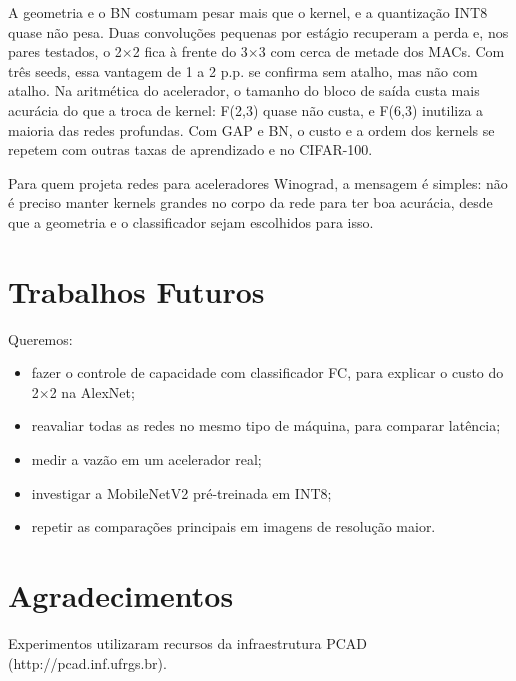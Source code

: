 \documentclass[conference]{IEEEtran}
\newcommand{\by}{\ensuremath{\times}}
\begin{document}
A geometria e o BN costumam pesar mais que o kernel, e a quantização INT8 quase não pesa. Duas convoluções pequenas por estágio recuperam a perda e, nos pares testados, o 2\by2 fica à frente do 3\by3 com cerca de metade dos MACs. Com três seeds, essa vantagem de 1 a 2 p.p. se confirma sem atalho, mas não com atalho. Na aritmética do acelerador, o tamanho do bloco de saída custa mais acurácia do que a troca de kernel: F(2,3) quase não custa, e F(6,3) inutiliza a maioria das redes profundas. Com GAP e BN, o custo e a ordem dos kernels se repetem com outras taxas de aprendizado e no CIFAR-100.

Para quem projeta redes para aceleradores Winograd, a mensagem é simples: não é preciso manter kernels grandes no corpo da rede para ter boa acurácia, desde que a geometria e o classificador sejam escolhidos para isso.

\section{Trabalhos Futuros}

Queremos:
\begin{itemize}
\item fazer o controle de capacidade com classificador FC, para explicar o custo do 2\by2 na AlexNet;
\item reavaliar todas as redes no mesmo tipo de máquina, para comparar latência;
\item medir a vazão em um acelerador real;
\item investigar a MobileNetV2 pré-treinada em INT8;
\item repetir as comparações principais em imagens de resolução maior.
\end{itemize}

\section*{Agradecimentos}
Experimentos utilizaram recursos da infraestrutura PCAD (http://pcad.inf.ufrgs.br).
\end{document}
